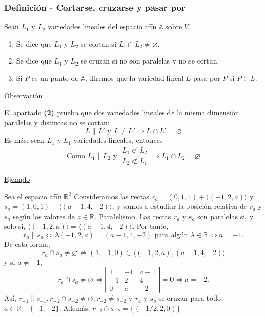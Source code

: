 \documentclass[12pt, a4paper, ones, notitlepage, openany,titlepage]{article}
\begin{document}
\subsubsection{Definición - Cortarse, cruzarse y pasar por}
\noindent Sean $L_{1}$ y $L_{2}$ variedades lineales del espacio afín $\mathbb{A}$ sobre $V$.
\begin{enumerate}[label=(\arabic*)]
\item Se dice que $L_{1}$ y $L_{2}$ se cortan si $L_{1} \cap L_{2} \neq \varnothing$.
\item Se dice que $L_{1}$ y $L_{2}$ se cruzan si no son paralelas y no se cortan.
\item Si $P$ es un punto de $\mathbb{A}$, diremos que la variedad lineal $L$ pasa por $P$ si $P \in L$.
\end{enumerate}
\noindent\underline{Observación}

El apartado \textbf{(2)} prueba que dos variedades lineales de la misma dimensión paralelas y distintas no se cortan:
$$
L \| L' \text{ y } L \neq L' \Longrightarrow L \cap L' = \varnothing
$$
\noindent Es más, sean $L_1$ y $L_1$ variedades lineales, entonces
$$
\text{Como } L_1 \| L_2 \text{ y } \begin{array}{r}
	L_1 \not\subset L_2 \\
	L_2 \not\subset L_1
\end{array} \Longrightarrow L_1 \cap L_2 = \varnothing
$$

\noindent\underline{Ejemplo}

Sea el espacio afín $\mathbb{R^3}$ Consideramos las rectas $r_{a}=(0,1,1)+\langle(-1,2, a)\rangle$ y $s_{a}=(1,0,1)+\langle(a-1,4,-2)\rangle$, y vamos a estudiar la posición relativa de $r_{a}$ y $s_{a}$ según los valores de $a \in \mathbb{R}$.
Paralelismo. Las rectas $r_{a}$ y $s_{a}$ son paralelas si, y solo si, $\langle(-1,2, a)\rangle=\langle(a-1,4,-2)\rangle$. Por tanto,
$$
r_{a} \| s_{a} \Longleftrightarrow \lambda(-1,2, a)=(a-1,4,-2) \text { para algún } \lambda \in \mathbb{R} \Longleftrightarrow a=-1 .
$$
De esta forma,
$$
r_{a} \cap s_{a} \neq \varnothing \Longleftrightarrow(1,-1,0) \in\langle(-1,2, a),(a-1,4,-2)\rangle
$$
y si $a \neq-1$,
$$
r_{a} \cap s_{a} \neq \varnothing \Longleftrightarrow\left|\begin{array}{rrr}
1 & -1 & a-1 \\
-1 & 2 & 4 \\
0 & a & -2
\end{array}\right|=0 \Longleftrightarrow a=-2 .
$$
Así, $r_{-1} \| s_{-1}, r_{-2} \cap s_{-2} \neq \varnothing, r_{-2} \neq s_{-2}$ y $r_{a}$ y $s_{a}$ se cruzan para todo $a \in \mathbb{R}-\{-1,-2\}$. Además, $r_{-2} \cap s_{-2}=\{(-1 / 2,2,0)\}$
\end{document}
